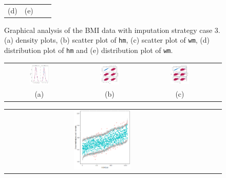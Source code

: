 \begin{figure} [ht!]
\begin{tabular}{cccc}
			\textnormal{(d)}  & \textnormal{(e)}  \\[6pt]
		\end{tabular}
		\caption{Graphical analysis of the BMI data with imputation strategy case 3. (a) density plots, (b) scatter plot of \texttt{hm}, (c) scatter plot of \texttt{wm}, (d) distribution plot of \texttt{hm} and (e) distribution plot of \texttt{wm}.}
		\label{fig6_11}
	\end{figure}
	
	
	\begin{figure} [ht!]
		\centering
		\begin{tabular}{cccc}
			\includegraphics[width=0.3\textwidth]{plots/densitycase4} &
			\includegraphics[width=0.3\textwidth]{plots/scattercase4hm} &
			\includegraphics[width=0.3\textwidth]{plots/scattercase4wm} \\
			\textnormal{(a)}  & \textnormal{(b)} & \textnormal{(c)}  \\[6pt]
		\end{tabular}
		\begin{tabular}{cccc}
			\includegraphics[width=0.3\textwidth]{plots/distributioncase4hm} &

\end{tabular}
\end{figure}
